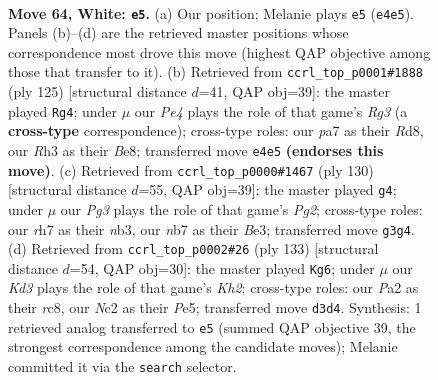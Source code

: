\documentclass[11pt]{article}
\begin{document}
\clearpage

\begin{figure}[p]\centering
\begin{subfigure}{0.46\textwidth}\centering
\resizebox{\linewidth}{!}{%
\newchessgame
\chessboard[
  setfen={2r3k1/pn5r/1p2p3/7p/2P1PB2/3K2PR/P1N2R2/8 w - - 10 64},
  showmover=false,
  pgfstyle=straightmove, color=movearrow, markmove={e4-e5}
]}
\caption{}
\end{subfigure}\hfill
\begin{subfigure}{0.46\textwidth}\centering
\resizebox{\linewidth}{!}{%
\newchessgame
\chessboard[
  setfen={3rb3/4k3/1p1pp1r1/7p/PNP2P2/1P6/3R3K/3R4 b - - 0 63},
  showmover=false,
  pgfstyle=straightmove, color=movearrow, markmove={g6-g4}
]}
\caption{}
\end{subfigure}
\\[4pt]
\begin{subfigure}{0.46\textwidth}\centering
\resizebox{\linewidth}{!}{%
\newchessgame
\chessboard[
  setfen={r4r2/8/4k1p1/p2p4/2p2P2/1nP1B2P/R5PK/3R4 w - - 3 66},
  showmover=false,
  pgfstyle=straightmove, color=movearrow, markmove={g2-g4}
]}
\caption{}
\end{subfigure}\hfill
\begin{subfigure}{0.46\textwidth}\centering
\resizebox{\linewidth}{!}{%
\newchessgame
\chessboard[
  setfen={2R5/2R2p1k/5P1p/1r1pp1p1/1P4P1/2K4P/r7/8 b - - 8 67},
  showmover=false,
  pgfstyle=straightmove, color=movearrow, markmove={h7-g6}
]}
\caption{}
\end{subfigure}
\caption{\textbf{Move 64, White: \texttt{e5}.} (a) Our position; Melanie plays \texttt{e5} (\texttt{e4e5}). Panels (b)--(d) are the retrieved master positions whose correspondence most drove this move (highest QAP objective among those that transfer to it). (b) Retrieved from \texttt{ccrl\_top\_p0001\#1888} (ply 125) [structural distance $d$=41, QAP obj=39]: the master played \texttt{Rg4}; under $\mu$ our \emph{Pe4} plays the role of that game's \emph{Rg3} (a \textbf{cross-type} correspondence); cross-type roles: our \emph{p}a7 as their \emph{R}d8, our \emph{R}h3 as their \emph{B}e8; transferred move \texttt{e4e5} \textbf{(endorses this move)}. (c) Retrieved from \texttt{ccrl\_top\_p0000\#1467} (ply 130) [structural distance $d$=55, QAP obj=39]: the master played \texttt{g4}; under $\mu$ our \emph{Pg3} plays the role of that game's \emph{Pg2}; cross-type roles: our \emph{r}h7 as their \emph{n}b3, our \emph{n}b7 as their \emph{B}e3; transferred move \texttt{g3g4}. (d) Retrieved from \texttt{ccrl\_top\_p0002\#26} (ply 133) [structural distance $d$=54, QAP obj=30]: the master played \texttt{Kg6}; under $\mu$ our \emph{Kd3} plays the role of that game's \emph{Kh2}; cross-type roles: our \emph{P}a2 as their \emph{r}c8, our \emph{N}c2 as their \emph{P}e5; transferred move \texttt{d3d4}. Synthesis: 1 retrieved analog transferred to \texttt{e5} (summed QAP objective 39, the strongest correspondence among the candidate moves); Melanie committed it via the \texttt{search} selector.}
\label{fig:thought-m126}
\end{figure}
\end{document}
